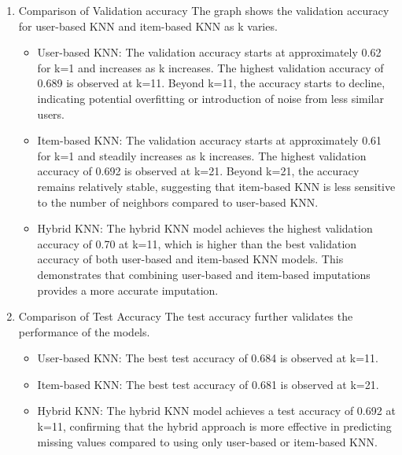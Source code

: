 \documentclass{article}
\begin{document}
\begin{enumerate}
    \item Comparison of Validation accuracy\newline
    The graph shows the validation accuracy for user-based KNN and item-based KNN as k varies.
    \begin{itemize}
        \item User-based KNN:\newline
        The validation accuracy starts at approximately 0.62 for k=1 and increases as k increases.
        The highest validation accuracy of 0.689 is observed at k=11.
        Beyond k=11, the accuracy starts to decline, indicating potential overfitting or introduction of noise from less similar users.
        \item Item-based KNN:\newline
        The validation accuracy starts at approximately 0.61 for k=1 and steadily increases as k increases.
        The highest validation accuracy of 0.692 is observed at k=21.
        Beyond k=21, the accuracy remains relatively stable, suggesting that item-based KNN is less sensitive to the number of neighbors compared to user-based KNN.
        \item Hybrid KNN:\newline
        The hybrid KNN model achieves the highest validation accuracy of 0.70 at k=11, which is higher than the best validation accuracy of both user-based and item-based KNN models.
        This demonstrates that combining user-based and item-based imputations provides a more accurate imputation.
    \end{itemize}
    \item Comparison of Test Accuracy\newline
    The test accuracy further validates the performance of the models.
    \begin{itemize}
        \item User-based KNN:\newline
        The best test accuracy of 0.684 is observed at k=11.
        \item Item-based KNN:\newline
        The best test accuracy of 0.681 is observed at k=21.
        \item Hybrid KNN:\newline
        The hybrid KNN model achieves a test accuracy of 0.692 at k=11, confirming that the hybrid approach is more effective in predicting missing values compared to using only user-based or item-based KNN.

\end{itemize}
\end{enumerate}
\end{document}
